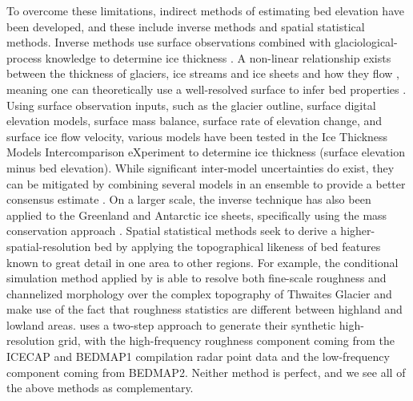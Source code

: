 \documentclass[tc, noline]{copernicus}
\begin{document}
To overcome these limitations, indirect methods of estimating bed elevation have been developed, and these include inverse methods and spatial statistical methods.
Inverse methods use surface observations combined with glaciological-process knowledge to determine ice thickness \citep[e.g.][]{vanPeltiterativeinversemethod2013}.
A non-linear relationship exists between the thickness of glaciers, ice streams and ice sheets and how they flow \citep{Raymondrelationshipsurfacebasal2005}, meaning one can theoretically use a well-resolved surface to infer bed properties \citep[e.g.][]{Farinottimethodestimateice2009}.
Using surface observation inputs, such as the glacier outline, surface digital elevation models, surface mass balance, surface rate of elevation change, and surface ice flow velocity, various models have been tested in the Ice Thickness Models Intercomparison eXperiment \citep[ITMIX;][]{FarinottiHowaccurateare2017} to determine ice thickness (surface elevation minus bed elevation).
While significant inter-model uncertainties do exist, they can be mitigated by combining several models in an ensemble to provide a better consensus estimate \citep{Farinotticonsensusestimateice2019}.
On a larger scale, the inverse technique has also been applied to the Greenland \citep{MorlighemBedMachinev3Complete2017} and Antarctic \citep{MorlighemDeepglacialtroughs2019} ice sheets, specifically using the mass conservation approach \citep{Morlighemmassconservationapproach2011}.
Spatial statistical methods seek to derive a higher-spatial-resolution bed by applying the topographical likeness of bed features known to great detail in one area to other regions.
For example, the conditional simulation method applied by \citet{GoffConditionalsimulationThwaites2014} is able to resolve both fine-scale roughness and channelized morphology over the complex topography of Thwaites Glacier and make use of the fact that roughness statistics are different between highland and lowland areas.
\citet{Grahamhighresolutionsyntheticbed2017} uses a two-step approach to generate their synthetic high-resolution grid, with the high-frequency roughness component coming from the ICECAP and BEDMAP1 compilation radar point data and the low-frequency component coming from BEDMAP2.
Neither method is perfect, and we see all of the above methods as complementary.
\end{document}
